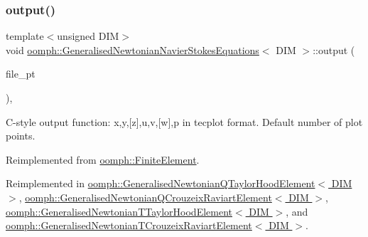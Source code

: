 \mbox{\label{classoomph_1_1GeneralisedNewtonianNavierStokesEquations_a0f56934ff2c1092a8e9bc457c93bf8cb}} 
\subsubsection{\texorpdfstring{output()}{output()}\hspace{0.1cm}{\footnotesize\ttfamily [3/4]}}
{\footnotesize\ttfamily template$<$unsigned D\+IM$>$ \\
void \hyperlink{classoomph_1_1GeneralisedNewtonianNavierStokesEquations}{oomph\+::\+Generalised\+Newtonian\+Navier\+Stokes\+Equations}$<$ D\+IM $>$\+::output (\begin{DoxyParamCaption}\item[{F\+I\+LE $\ast$}]{file\+\_\+pt }\end{DoxyParamCaption})\hspace{0.3cm}{\ttfamily [inline]}, {\ttfamily [virtual]}}



C-\/style output function\+: x,y,\mbox{[}z\mbox{]},u,v,\mbox{[}w\mbox{]},p in tecplot format. Default number of plot points. 



Reimplemented from \hyperlink{classoomph_1_1FiniteElement_a72cddd09f8ddbee1a20a1ff404c6943e}{oomph\+::\+Finite\+Element}.



Reimplemented in \hyperlink{classoomph_1_1GeneralisedNewtonianQTaylorHoodElement_ab0d6408d32a068798cdb404db5daadad}{oomph\+::\+Generalised\+Newtonian\+Q\+Taylor\+Hood\+Element$<$ D\+I\+M $>$}, \hyperlink{classoomph_1_1GeneralisedNewtonianQCrouzeixRaviartElement_a5229c52c67179de461423ab34d7f8a7d}{oomph\+::\+Generalised\+Newtonian\+Q\+Crouzeix\+Raviart\+Element$<$ D\+I\+M $>$}, \hyperlink{classoomph_1_1GeneralisedNewtonianTTaylorHoodElement_a4792f7006a06e705cf7d54c7933c1375}{oomph\+::\+Generalised\+Newtonian\+T\+Taylor\+Hood\+Element$<$ D\+I\+M $>$}, and \hyperlink{classoomph_1_1GeneralisedNewtonianTCrouzeixRaviartElement_a3147cc62be2891996cf4e11fe8e5be79}{oomph\+::\+Generalised\+Newtonian\+T\+Crouzeix\+Raviart\+Element$<$ D\+I\+M $>$}.



